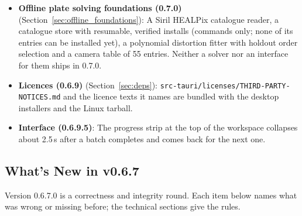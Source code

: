 \documentclass[11pt,a4paper]{article}
\newcommand{\code}[1]{\texttt{\small #1}}
\begin{document}
\begin{itemize}[nosep]
\begin{itemize}[nosep]
        \item \textbf{Keyword aliases (0.7.0)}: MaxIm DL, N.I.N.A. and SharpCap spellings of pixel size, focal length, temperature, binning, frame type and pointing.
        \end{itemize}
    \item \textbf{Offline plate solving foundations (0.7.0)} (Section~\ref{sec:offline_foundations}): A Siril HEALPix catalogue reader, a catalogue store with resumable, verified installs (commands only; none of its entries can be installed yet), a polynomial distortion fitter with holdout order selection and a camera table of 55 entries. Neither a solver nor an interface for them ships in 0.7.0.
    \item \textbf{Licences (0.6.9)} (Section~\ref{sec:deps}): \code{src-tauri/licenses/THIRD-PARTY-NOTICES.md} and the licence texts it names are bundled with the desktop installers and the Linux tarball.
    \item \textbf{Interface (0.6.9.5)}: The progress strip at the top of the workspace collapses about 2.5\,s after a batch completes and comes back for the next one.
    \end{itemize}

    \subsection{What's New in v0.6.7}
    \label{sec:new_067}

    Version 0.6.7.0 is a correctness and integrity round. Each item below names what was wrong or missing before; the technical sections give the rules.
\end{document}
